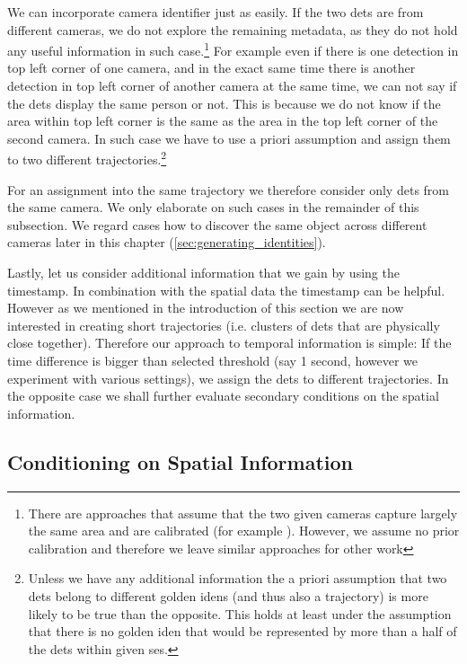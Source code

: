 We can incorporate camera identifier just as easily. If the two
\glspl{det} are from different cameras, we do not explore the remaining
metadata, as they do not hold any useful information in such
case.\footnote{There
are approaches that assume that the two given cameras capture largely the same
area and are calibrated (for example \cite{hu2006principal}). However, we
assume no prior calibration and therefore we leave similar approaches for other
work} For example even if there is one detection in top left corner of one
camera, and in the exact same time there is another detection in top left corner
of another camera at the same time, we can not say if the \glspl{det}
display the same person or not. This is
because we do not know if the area within top left corner is the same as the
area in the top left corner of the second camera. In such case we have to use
a priori assumption and assign them to two different
trajectories.\footnote{Unless we have any additional information the a priori
assumption that two \glspl{det} belong to different golden \glspl{iden} (and thus also a trajectory) is more
likely to be true than the opposite. This holds at least under the assumption that there is no
golden \gls{iden} that would be represented by more than a half of the
\glspl{det} within given \gls{ses}.}

For an assignment into the same trajectory we therefore consider only \glspl{det}
from the same camera. We only elaborate on such cases in the remainder
of this subsection. We regard cases how to discover the same object across
different cameras later in this chapter (\autoref{sec:generating_identities}).

Lastly, let us consider additional information that we gain by using the timestamp.
In combination with the spatial data the timestamp can be helpful. However as
we mentioned in the introduction of this section
we are now interested in creating short trajectories (i.e. clusters of
\glspl{det} that are physically close together). Therefore
our approach to temporal information is simple: If the time difference is
bigger than selected threshold (say 1 second, however we experiment with
various settings), we assign the \glspl{det} to different trajectories. In the
opposite case we shall further evaluate secondary conditions on the spatial
information.

\subsection{Conditioning on Spatial Information}

